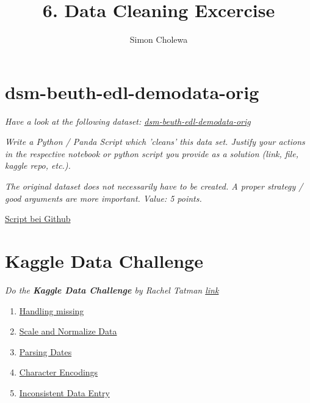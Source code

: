 \documentclass[11pt,a4paper]{article}
\author{Simon Cholewa}
\title{6. Data Cleaning Excercise}
\begin{document}
\maketitle

\section{dsm-beuth-edl-demodata-orig}

\textit{Have a look at the following dataset: \hyperref{https://github.com/edlich/eternalrepo/blob/master/DS-WAHLFACH/dsm-beuth-edl-demodata-dirty.csv}{}{}{dsm-beuth-edl-demodata-orig}}

\textit{Write a Python / Panda Script which 'cleans' this data set. Justify your actions in the respective notebook or python script you provide as a solution (link, file, kaggle repo, etc.).}

\textit{The original dataset does not necessarily have to be created. A proper strategy / good arguments are more important. Value: 5 points.}

\hyperref{https://raw.githubusercontent.com/grutzwurst/Data_Science/EA_06/EA_06/scripts/aufgabe1.py}{}{}{Script bei Github}




\section{Kaggle Data Challenge}

\textit{Do the \textbf{Kaggle Data Challenge} by Rachel Tatman \hyperref{https://mailchi.mp/kaggle.com/5-day-data-challenge-data-cleaning-day-1?e=08afe8bf5d}{}{}{link}}

\begin{enumerate}
	\item \hyperref{https://www.kaggle.com/simoncholewa/data-cleaning-challenge-handling-missing-v-71e48a}{}{}{Handling missing}
	\item \hyperref{https://www.kaggle.com/simoncholewa/data-cleaning-challenge-scale-and-normalize-data}{}{}{Scale and Normalize Data}
	\item \hyperref{https://www.kaggle.com/simoncholewa/data-cleaning-challenge-parsing-dates}{}{}{Parsing Dates}
	\item \hyperref{https://www.kaggle.com/simoncholewa/data-cleaning-challenge-character-encodings}{}{}{Character Encodings}
	\item \hyperref{https://www.kaggle.com/simoncholewa/notebook2ae16dad09}{}{}{Inconsistent Data Entry}
\end{enumerate}
\end{document}
